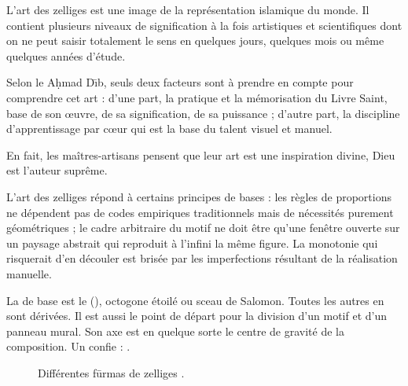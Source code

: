 L'art des zelliges est une image de la représentation islamique 
du monde. Il contient plusieurs niveaux de signification à la fois 
artistiques et scientifiques dont on ne peut saisir totalement le 
sens en quelques jours, quelques mois ou même quelques années d'étude.

Selon le \maallem A\d{h}mad D\={\i}b, seuls deux facteurs sont 
à prendre en compte pour comprendre cet art : d'une part, la pratique 
et la mémorisation du Livre Saint, base de son {\oe}uvre, de sa 
signification, de sa puissance ; d'autre part, la discipline 
d'apprentissage par c{\oe}ur qui est la base du talent visuel et 
manuel.

En fait, les maîtres-artisans pensent que leur art est une inspiration 
divine, Dieu est l'auteur suprême.

L'art des zelliges répond à certains principes de bases : les règles 
de proportions ne dépendent pas de codes empiriques traditionnels mais 
de nécessités purement géométriques ; le cadre arbitraire du motif ne 
doit être qu'une fenêtre ouverte sur un paysage abstrait qui reproduit 
à l'infini la même figure. La monotonie qui risquerait d'en découler 
est brisée par les imperfections résultant de la réalisation manuelle.

La \furma de base est le \hatim (), 
octogone étoilé ou sceau de Salomon. Toutes les autres 
\furmas en sont dérivées. Il est aussi le point de départ 
pour la division d'un motif et d'un panneau mural. Son axe est en 
quelque sorte le centre de gravité de la composition. Un \zlaygi 
confie :  
\autocite{Castera_1996}.

\begin{figure}[htb]
  \caption{Différentes f\={u}rmas de zelliges \autocite{Castera_1996}.}
  \label{fig:furmas}
\end{figure}

